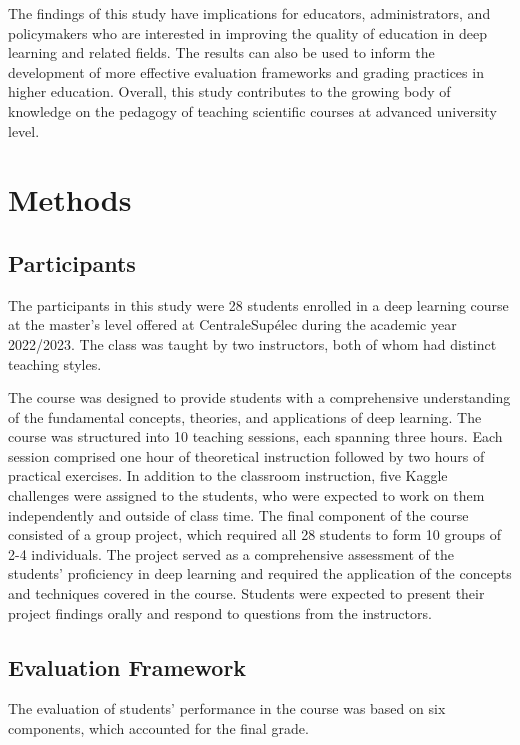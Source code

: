 \documentclass[a4paper]{article}
\begin{document}
	The findings of this study have implications for educators, administrators, and policymakers who are interested in improving the quality of education in deep learning and related fields.
	The results can also be used to inform the development of more effective evaluation frameworks and grading practices in higher education.
	Overall, this study contributes to the growing body of knowledge on the pedagogy of teaching scientific courses at advanced university level.
	
	\section{Methods}
	\subsection{Participants}
	The participants in this study were 28 students enrolled in a deep learning course at the master's level offered at CentraleSupélec during the academic year 2022/2023.
	The class was taught by two instructors, both of whom had distinct teaching styles.
	
	The course was designed to provide students with a comprehensive understanding of the fundamental concepts, theories, and applications of deep learning.
	The course was structured into 10 teaching sessions, each spanning three hours.
	Each session comprised one hour of theoretical instruction followed by two hours of practical exercises.
	In addition to the classroom instruction, five Kaggle challenges were assigned to the students, who were expected to work on them independently and outside of class time.
	The final component of the course consisted of a group project, which required all 28 students to form 10 groups of 2-4 individuals.
	The project served as a comprehensive assessment of the students' proficiency in deep learning and required the application of the concepts and techniques covered in the course.
	Students were expected to present their project findings orally and respond to questions from the instructors.
	
	
	
	\subsection{Evaluation Framework}
	The evaluation of students' performance in the course was based on six components, which accounted for the final grade.
	
\end{document}
